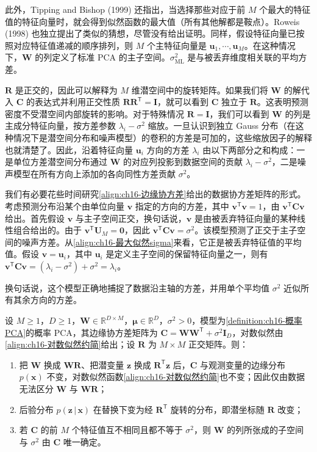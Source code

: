 \documentclass[../../main.tex]{subfiles}
\begin{document}
此外，Tipping and Bishop (1999) 还指出，当选择那些对应于前 $M$ 个最大的特征值的特征向量时，就会得到似然函数的最大值（所有其他解都是鞍点）。Roweis (1998) 也独立提出了类似的猜想，尽管没有给出证明。同样，假设特征向量已按照对应特征值递减的顺序排列，则 $M$ 个主特征向量是 $\bm{u}_1,\cdots,\bm{u}_M$。在这种情况下，$\bm{W}$ 的列定义了标准 PCA 的主子空间。$\sigma^2_{\text{ML}}$ 是与被丢弃维度相关联的平均方差。

$\bm{R}$ 是正交的，因此可以解释为 $M$ 维潜空间中的旋转矩阵。如果我们将 $\bm{W}$ 的解代入 $\bm{C}$ 的表达式并利用正交性质 $\bm{R}\bm{R}^{\mathsf T}=\bm{I}$，就可以看到 $\bm{C}$ 独立于 $\bm{R}$。这表明预测密度不受潜空间内部旋转的影响。对于特殊情况 $\bm{R}=\bm{I}$，我们可以看到 $\bm{W}$ 的列是主成分特征向量，按方差参数 $\lambda_i-\sigma^2$ 缩放。一旦认识到独立 Gauss 分布（在这种情况下是潜空间分布和噪声模型）的卷积的方差是可加的，这些缩放因子的解释也就清楚了。因此，沿着特征向量 $\bm{u}_i$ 方向的方差 $\lambda_i$ 由以下两部分之和构成：一是单位方差潜空间分布通过 $\bm{W}$ 的对应列投影到数据空间的贡献 $\lambda_i-\sigma^2$，二是噪声模型在所有方向上添加的各向同性方差贡献 $\sigma^2$。

我们有必要花些时间研究\eqref{align:ch16-边缘协方差}给出的数据协方差矩阵的形式。考虑预测分布沿某个由单位向量 $\bm{v}$ 指定的方向的方差，其中 $\bm{v}^{\mathsf T}\bm{v}=1$，由 $\bm{v}^{\mathsf T}\bm{C}\bm{v}$ 给出。首先假设 $\bm{v}$ 与主子空间正交，换句话说，$\bm{v}$ 是由被丢弃特征向量的某种线性组合给出的。由于 $\bm{v}^{\mathsf T}\bm{U}_M=\bm{0}$，因此 $\bm{v}^{\mathsf T}\bm{C}\bm{v}=\sigma^2$。该模型预测了正交于主子空间的噪声方差。从\eqref{align:ch16-最大似然sigma}来看，它正是被丢弃特征值的平均值。假设 $\bm{v}=\bm{u}_i$，其中 $\bm{u}_i$ 是定义主子空间的保留特征向量之一，则有 $\bm{v}^{\mathsf T}\bm{C}\bm{v}=(\lambda_i-\sigma^2)+\sigma^2=\lambda_i$。

换句话说，这个模型正确地捕捉了数据沿主轴的方差，并用单个平均值 $\sigma^2$ 近似所有其余方向的方差。

\begin{proposition}[潜空间旋转的不可识别性]\label{proposition:ch16-旋转不可识别}
设 $M\geqslant1$，$D\geqslant1$，$\bm{W}\in\mathbb{R}^{D\times M}$，$\bm{\mu}\in\mathbb{R}^{D}$，$\sigma^2>0$，模型为\cref{definition:ch16-概率PCA}的概率 PCA，其边缘协方差矩阵为 $\bm{C}=\bm{W}\bm{W}^{\mathsf T}+\sigma^2\bm{I}_D$，对数似然由\eqref{align:ch16-对数似然约简}给出；设 $\bm{R}$ 为 $M\times M$ 正交矩阵。则：
\begin{enumerate}
\item 把 $\bm{W}$ 换成 $\bm{W}\bm{R}$、把潜变量 $\bm{z}$ 换成 $\bm{R}^{\mathsf T}\bm{z}$ 后，$\bm{C}$ 与观测变量的边缘分布 $p(\bm{x})$ 不变，对数似然函数\eqref{align:ch16-对数似然约简}也不变；因此仅由数据无法区分 $\bm{W}$ 与 $\bm{W}\bm{R}$；
\item 后验分布 $p(\bm{z}\,|\,\bm{x})$ 在替换下变为经 $\bm{R}^{\mathsf T}$ 旋转的分布，即潜坐标随 $\bm{R}$ 改变；
\item 若 $\bm{C}$ 的前 $M$ 个特征值互不相同且都不等于 $\sigma^2$，则 $\bm{W}$ 的列所张成的子空间与 $\sigma^2$ 由 $\bm{C}$ 唯一确定。
\end{enumerate}
\end{proposition}
\end{document}

